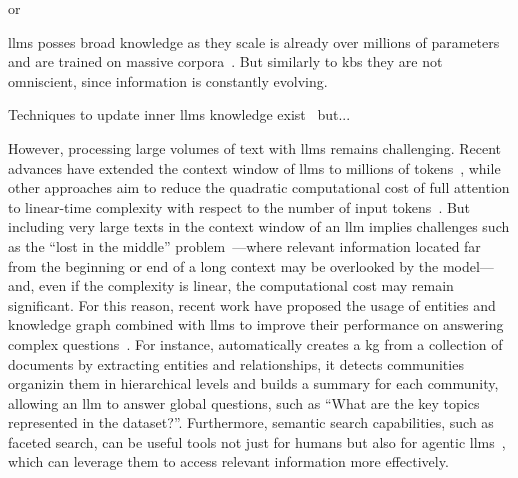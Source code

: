 or 

\Aclp{llm} posses broad knowledge as they scale is already over millions of parameters and are trained on massive corpora~\cite{}. But similarly to \acp{kb} they are not omniscient, since information is constantly evolving.


Techniques to update inner \acp{llm} knowledge exist~\cite{} but...




%
However, processing large volumes of text with \acp{llm} remains challenging\cite{}.
Recent advances have extended the context window of \acp{llm} to millions of tokens~\cite{geminiteam2024gemini15unlockingmultimodal,kuratov2024searchneedles11mhaystack}, while other approaches aim to reduce the quadratic computational cost of full attention to linear-time complexity with respect to the number of input tokens~\cite{bigbird_2020,beltagy2020longformerlongdocumenttransformer,ding2023longnetscalingtransformers1000000000}.
But including very large texts in the context window of an \ac{llm} implies challenges such as the ``lost in the middle'' problem~\cite{liu-etal-2024-lost}---where relevant information located far from the beginning or end of a long context may be overlooked by the model---and, even if the complexity is linear, the computational cost may remain significant.
For this reason, recent work have proposed the usage of entities and knowledge graph combined with \acp{llm} to improve their performance on answering complex questions~\cite{edge2025localglobalgraphrag,hybridrag_kg_vector_rag_2024,Xu_2024_rag_kg}.
For instance, \textcite{edge2025localglobalgraphrag} automatically creates a \acl{kg} from a collection of documents by extracting entities and relationships, it detects communities organizin them in hierarchical levels and builds a summary for each community, allowing an \ac{llm} to answer global questions, such as ``What are the key topics represented in the dataset?''.
Furthermore, semantic search capabilities, such as faceted search, can be useful tools not just for humans but also for agentic \acp{llm}~\cite{thoppilan2022lamdalanguagemodelsdialog,parisi2022talmtoolaugmentedlanguage,schick2023toolformerlanguagemodelsteach,yao2023react,gao-etal-2025-efficient}, which can leverage them to access relevant information more effectively.

